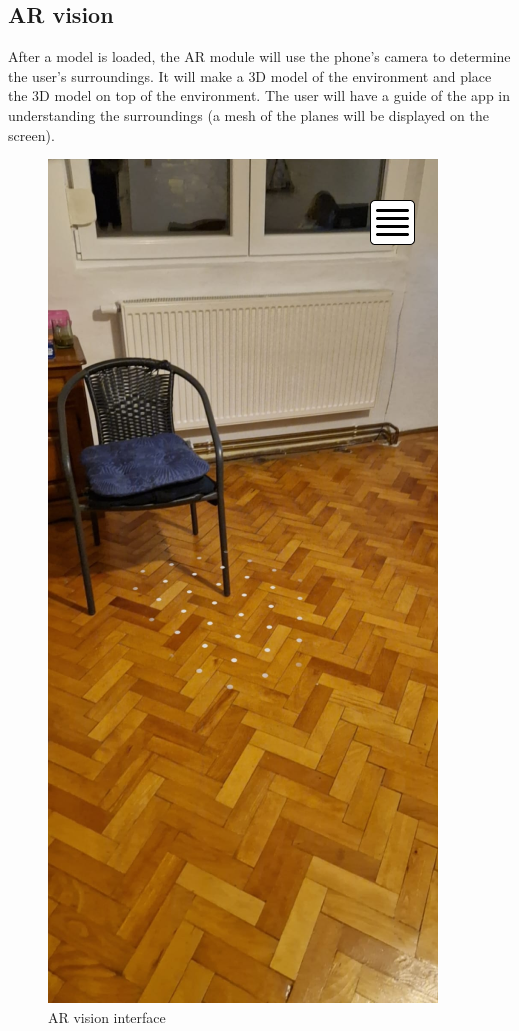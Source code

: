 \subsection{AR vision}
After a model is loaded, the \ac{AR} module will use the phone's camera to determine the user's surroundings. It will make a \ac{3D} model of the environment and place the \ac{3D} model on top of the environment. The user will have a guide of the app in understanding the surroundings (a mesh of the planes will be displayed on the screen).
\begin{figure}[h!]
    \begin{center}
        \includegraphics[scale=0.5]{img/App_mock/iPhone 14 - 5.png}
        \caption{\ac{AR} vision interface}
        \label{fig:ar-vision}
    \end{center}
\end{figure}

